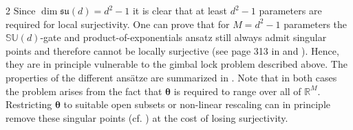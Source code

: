\documentclass{article}
\renewcommand{\vec}[1]{\ensuremath{\boldsymbol{#1}}}
\begin{document}
\begin{multicols}{2}
Since \(\operatorname{dim} \mathfrak{su}(d) = d^2-1\) it is clear that at least \(d^2-1\) parameters are required for local surjectivity.
One can prove that for \(M = d^2 - 1\) parameters the \(\mathbb{SU}(d)\)-gate and product-of-exponentials ansatz still always admit singular points and therefore cannot be locally
surjective (see page 313 in \cite{hilgert_structure_2012} and \cite{altafini_use_2002}).
Hence, they are in principle vulnerable to the gimbal lock problem described above.  The properties of the different ans\"atze are summarized in .
Note that in both cases the problem arises from the fact that $\vec{\theta}$ is required to range over all of $\mathbb{R}^M$. Restricting $\vec{\theta}$ to suitable open subsets or non-linear rescaling can in principle remove these singular points (cf. ) at the cost of losing surjectivity.


\end{multicols}
\end{document}
